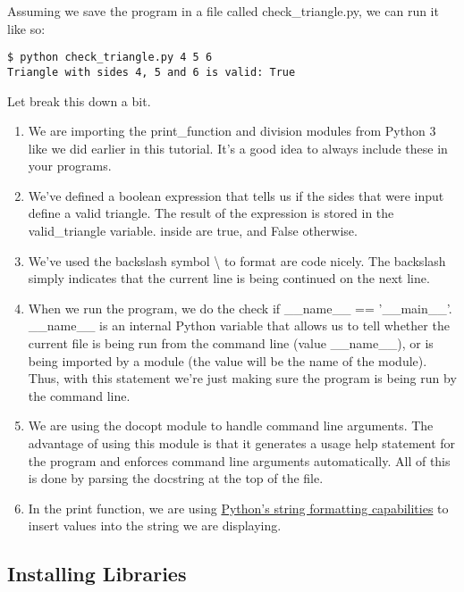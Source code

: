 Assuming we save the program in a file called check\_triangle.py, we can
run it like so:

\begin{verbatim}
$ python check_triangle.py 4 5 6
Triangle with sides 4, 5 and 6 is valid: True
\end{verbatim}

Let break this down a bit.

\begin{enumerate}

\item
  We are importing the print\_function and division modules from Python
  3 like we did earlier in this tutorial. It's a good idea to always
  include these in your programs.
\item
  We've defined a boolean expression that tells us if the sides that
  were input define a valid triangle. The result of the expression is
  stored in the valid\_triangle variable. inside are true, and False
  otherwise.
\item
  We've used the backslash symbol \textbackslash{} to format are code
  nicely. The backslash simply indicates that the current line is being
  continued on the next line.
\item
  When we run the program, we do the check if \_\_name\_\_ ==
  '\_\_main\_\_'. \_\_name\_\_ is an internal Python variable that
  allows us to tell whether the current file is being run from the
  command line (value \_\_name\_\_), or is being imported by a module
  (the value will be the name of the module). Thus, with this statement
  we're just making sure the program is being run by the command line.
\item
  We are using the docopt module to handle command line arguments. The
  advantage of using this module is that it generates a usage help
  statement for the program and enforces command line arguments
  automatically. All of this is done by parsing the docstring at the top
  of the file.
\item
  In the print function, we are using
  \href{https://docs.python.org/2/library/string.html\#format-string-syntax}{Python's
  string formatting capabilities} to insert values into the string we
  are displaying.
\end{enumerate}

\subsection{Installing Libraries}\label{installing-libraries}

